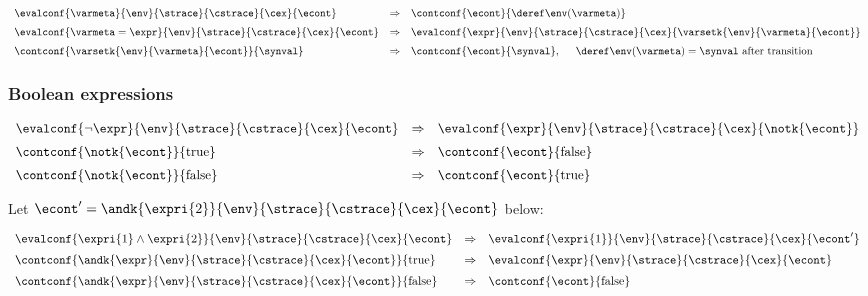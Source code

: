 \documentclass{article}
\begin{document}
\[
  \begin{array}{lcl}
	\evalconf{\varmeta}{\env}{\strace}{\cstrace}{\cex}{\econt}
	& \Rightarrow &
	\contconf{\econt}{\deref\env(\varmeta)}\\[2mm]

	\evalconf{\varmeta = \expr}{\env}{\strace}{\cstrace}{\cex}{\econt}
	& \Rightarrow &
	\evalconf{\expr}{\env}{\strace}{\cstrace}{\cex}{\varsetk{\env}{\varmeta}{\econt}}\\[2mm]

	\contconf{\varsetk{\env}{\varmeta}{\econt}}{\synval}
	& \Rightarrow &
	\contconf{\econt}{\synval}, \hspace{5mm} \deref\env(\varmeta) = \synval \textrm{ after transition}

  \end{array}
\]

\subsubsection{Boolean expressions}
\newcommand{\true}{\mathrm{true}}
\newcommand{\false}{\mathrm{false}}

\[
  \begin{array}{lll}
	\evalconf{\neg\expr}{\env}{\strace}{\cstrace}{\cex}{\econt}
	& \Rightarrow &
	\evalconf{\expr}{\env}{\strace}{\cstrace}{\cex}{\notk{\econt}}\\[2mm]

	\contconf{\notk{\econt}}{\true}
	& \Rightarrow &
	\contconf{\econt}{\false}\\[2mm]

	\contconf{\notk{\econt}}{\false}
	& \Rightarrow &
	\contconf{\econt}{\true}
  \end{array}
\]

\noindent
Let $\econt' = \andk{\expri{2}}{\env}{\strace}{\cstrace}{\cex}{\econt}$ below:

\[
  \begin{array}{lcl}
	\evalconf{\expri{1} \land \expri{2}}{\env}{\strace}{\cstrace}{\cex}{\econt}
	& \Rightarrow &
	\evalconf{\expri{1}}{\env}{\strace}{\cstrace}{\cex}{\econt'}\\[2mm]

	\contconf{\andk{\expr}{\env}{\strace}{\cstrace}{\cex}{\econt}}{\true}
	& \Rightarrow &
	\evalconf{\expr}{\env}{\strace}{\cstrace}{\cex}{\econt}\\[2mm]

	\contconf{\andk{\expr}{\env}{\strace}{\cstrace}{\cex}{\econt}}{\false}
	& \Rightarrow &
	\contconf{\econt}{\false}\\
  \end{array}
\]
\end{document}
